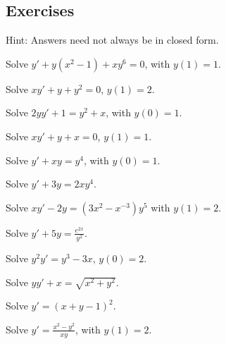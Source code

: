 \subsection{Exercises}

Hint: Answers need not always be in closed form.

\begin{exercise}
Solve
$y'+ y(x^2-1)+xy^6 = 0$, with $y(1)=1$.
\end{exercise}

\begin{exercise}\ansMark%
Solve $xy'+y+y^2 = 0$, $y(1)=2$.
\end{exercise}

\begin{exercise}
Solve $2yy' + 1 = y^2 + x$, with $y(0)=1$.
\end{exercise}

\begin{exercise}\ansMark%
Solve $xy'+y +x = 0$, $y(1)=1$.
\end{exercise}

\begin{exercise}
Solve $y' + xy = y^4$, with $y(0)=1$.
\end{exercise}

\begin{exercise}
Solve $y' + 3y = 2xy^4$.
\end{exercise}

\begin{exercise}
Solve $xy' - 2y = (3x^2 - x^{-3})y^5$ with $y(1) = 2$. 
\end{exercise}

\begin{exercise}
Solve $y' + 5y = \frac{e^{2x}}{y^2}$.
\end{exercise}

\begin{exercise}\ansMark%
Solve $y^2y' = y^3-3x$, $y(0)=2$.
\end{exercise}

\begin{exercise}
Solve $yy' + x = \sqrt{x^2 + y^2}$.
\end{exercise}

\begin{exercise}
Solve $y' = {(x+y-1)}^2$.
\end{exercise}

\begin{exercise}
Solve $y' = \frac{x^2-y^2}{x y}$, with $y(1) = 2$.
\end{exercise}

